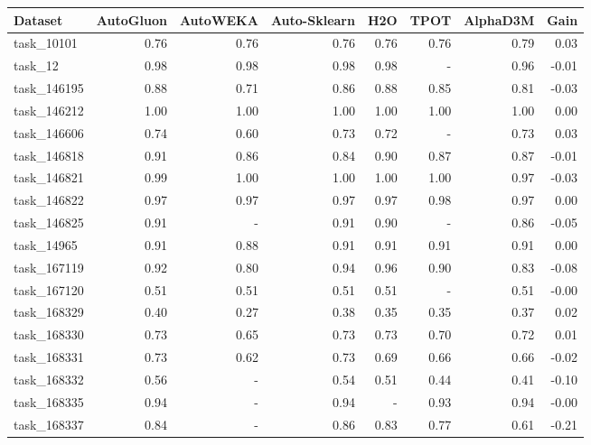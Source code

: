 \begin{tabular}{lrrrrrrr}
\toprule
     Dataset &  AutoGluon &  AutoWEKA &  Auto-Sklearn &  H2O &  TPOT &  AlphaD3M &  Gain \\
\midrule
  task\_10101 &       0.76 &      0.76 &          0.76 & 0.76 &  0.76 &      0.79 &  0.03 \\
     task\_12 &       0.98 &      0.98 &          0.98 & 0.98 &     - &      0.96 & -0.01 \\
 task\_146195 &       0.88 &      0.71 &          0.86 & 0.88 &  0.85 &      0.81 & -0.03 \\
 task\_146212 &       1.00 &      1.00 &          1.00 & 1.00 &  1.00 &      1.00 &  0.00 \\
 task\_146606 &       0.74 &      0.60 &          0.73 & 0.72 &     - &      0.73 &  0.03 \\
 task\_146818 &       0.91 &      0.86 &          0.84 & 0.90 &  0.87 &      0.87 & -0.01 \\
 task\_146821 &       0.99 &      1.00 &          1.00 & 1.00 &  1.00 &      0.97 & -0.03 \\
 task\_146822 &       0.97 &      0.97 &          0.97 & 0.97 &  0.98 &      0.97 &  0.00 \\
 task\_146825 &       0.91 &         - &          0.91 & 0.90 &     - &      0.86 & -0.05 \\
  task\_14965 &       0.91 &      0.88 &          0.91 & 0.91 &  0.91 &      0.91 &  0.00 \\
 task\_167119 &       0.92 &      0.80 &          0.94 & 0.96 &  0.90 &      0.83 & -0.08 \\
 task\_167120 &       0.51 &      0.51 &          0.51 & 0.51 &     - &      0.51 & -0.00 \\
 task\_168329 &       0.40 &      0.27 &          0.38 & 0.35 &  0.35 &      0.37 &  0.02 \\
 task\_168330 &       0.73 &      0.65 &          0.73 & 0.73 &  0.70 &      0.72 &  0.01 \\
 task\_168331 &       0.73 &      0.62 &          0.73 & 0.69 &  0.66 &      0.66 & -0.02 \\
 task\_168332 &       0.56 &         - &          0.54 & 0.51 &  0.44 &      0.41 & -0.10 \\
 task\_168335 &       0.94 &         - &          0.94 &    - &  0.93 &      0.94 & -0.00 \\
 task\_168337 &       0.84 &         - &          0.86 & 0.83 &  0.77 &      0.61 & -0.21 \\

\end{tabular}
